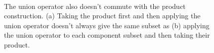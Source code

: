 \documentclass[
  letterpaper,
  DIV=11,
  numbers=noendperiod]{scrartcl}
\begin{document}
\begin{figure}
\begin{minipage}[t]{0.70\linewidth}
{\centering 


}

\subcaption{\label{fig-up}}
\end{minipage}%
%
\begin{minipage}[t]{0.15\linewidth}

{\centering 

~

}

\end{minipage}%

\caption{\label{fig-product-set-union}The union operator also doesn't
commute with the product construction. (a) Taking the product first and
then applying the union operator doesn't always give the same subset as
(b) applying the union operator to each component subset and then taking
their product.}

\end{figure}
\end{document}
